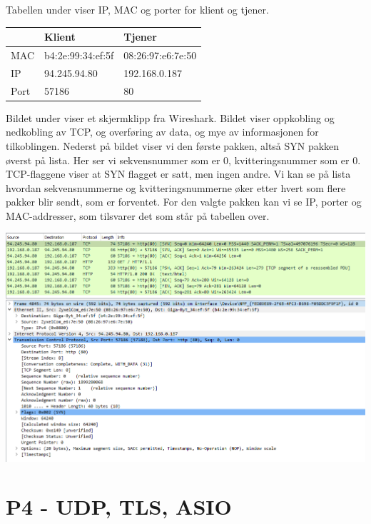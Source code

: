 \documentclass[12pt]{article}
\begin{document}
    Tabellen under viser IP, MAC og porter for klient og tjener.
    
    \begin{center}
        \begin{tabular}{|l|l|l|}
            \hline
                 & Klient            & Tjener            \\ \hline
            MAC  & b4:2e:99:34:ef:5f & 08:26:97:e6:7e:50 \\ \hline
            IP   & 94.245.94.80      & 192.168.0.187     \\ \hline
            Port & 57186             & 80                \\ \hline
        \end{tabular}
    \end{center}

    Bildet under viser et skjermklipp fra Wireshark. Bildet viser oppkobling og nedkobling av TCP, og 
    overføring av data, og mye av informasjonen for tilkoblingen. 
    Nederst på bildet viser vi den første pakken, altså SYN pakken øverst på lista. Her ser vi
    sekvensnummer som er 0, kvitteringsnummer som er 0. TCP-flaggene viser at SYN flagget er satt, 
    men ingen andre. Vi kan se på lista hvordan sekvensnummerne og kvitteringsnummerne øker etter hvert
    som flere pakker blir sendt, som er forventet. For den valgte pakken kan vi se IP, porter og 
    MAC-addresser, som tilsvarer det som står på tabellen over. 
    
    \begin{center}
        \includegraphics[width=7in]{assets/z4qWyHn.png}
    \end{center}
    
    \section{P4 - UDP, TLS, ASIO}
\end{document}
